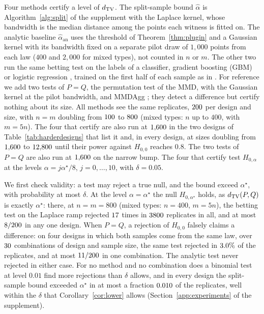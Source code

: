 Four methods certify a level of $d_{\mathrm{TV}}$. The split-sample bound $\widehat\alpha$ is Algorithm~\ref{alg:split} of the
supplement with the Laplace kernel, whose bandwidth is the median distance among the points each witness is fitted on.
The analytic baseline $\widehat\alpha_{\mathrm{an}}$ uses the threshold of Theorem~\ref{thm:plugin} and a Gaussian
kernel with its bandwidth fixed on a separate pilot draw of $1{,}000$ points from each law ($400$ and $2{,}000$ for
mixed types), not counted in $n$ or $m$. The other two run the same betting test on the labels of a
classifier, gradient boosting (GBM) or logistic regression \citep{pedregosa2011sklearn}, trained on the first half of
each sample as in \citet{naf2022hplb}. For reference we add two tests of $P=Q$, the permutation test of the MMD, with
the Gaussian kernel at the pilot bandwidth, and MMDAgg \citep{schrab2023aggregated}; they detect a difference but
certify nothing about its size. All methods see the same replicates, $200$ per design and size, with $n=m$
doubling from $100$ to $800$ (mixed types: $n$ up to $400$, with $m=5n$). The four that certify are also
run at $\fourdigits{\harderNtwo}$ in the two designs of Table~\ref{tab:harderdesigns} that list it and, in every
design, at sizes doubling from $\fourdigits{\harderNtwo}$ to $12{,}800$ until their power against $H_{0,0}$ reaches
$0.8$. The two tests of $P=Q$ are also run at $\fourdigits{\harderNtwo}$ on the narrow bump. The four that certify
test $H_{0,\alpha}$ at the levels $\alpha=j\alpha^\star/8$, $j=0,\dots,10$, with $\delta=0.05$.

We first check validity: a test may reject a true null, and the bound exceed $\alpha^\star$, with probability at most
$\delta$. At the level $\alpha=\alpha^\star$ the null $H_{0,\alpha^\star}$ holds, as $d_{\mathrm{TV}}(P,Q)$ is
exactly $\alpha^\star$: there, at $n=m=800$ (mixed types: $n=400$, $m=5n$), the betting test on the Laplace ramp
rejected $17$ times in $3800$ replicates in all, and at most $8/200$ in any one design. When $P=Q$, a
rejection of $H_{0,0}$ falsely claims a difference: on four designs in which both samples come from the same law,
over $30$ combinations of design and sample size, the same test rejected in $3.0\%$ of the replicates,
and at most $11/200$ in one combination. The analytic test never rejected in either case. For no method and no
combination does a binomial test at level $0.01$ find more rejections than $\delta$ allows, and in every design the
split-sample bound exceeded $\alpha^\star$ in at most a fraction $0.010$ of the replicates, well within the
$\delta$ that Corollary~\ref{cor:lower} allows (Section~\ref{app:experiments} of the supplement).

